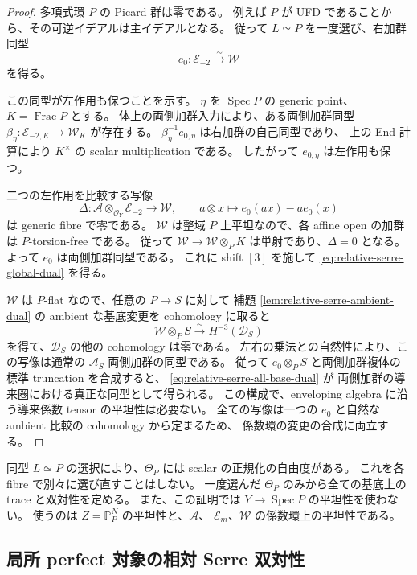 \begin{proof}
多項式環 $P$ の Picard 群は零である。
例えば $P$ が UFD であることから、その可逆イデアルは主イデアルとなる。
従って $L\simeq P$ を一度選び、右加群同型
\[
 e_0:\mathscr E_{-2}\xrightarrow{\sim}\mathscr W
\]
を得る。

この同型が左作用も保つことを示す。
$\eta$ を $\operatorname{Spec}P$ の generic point、$K=\operatorname{Frac}P$ とする。
体上の両側加群入力により、ある両側加群同型
$\beta_\eta:\mathscr E_{-2,K}\to\mathscr W_K$ が存在する。
$\beta_\eta^{-1}e_{0,\eta}$ は右加群の自己同型であり、
上の End 計算により $K^\times$ の scalar multiplication である。
したがって $e_{0,\eta}$ は左作用も保つ。

二つの左作用を比較する写像
\[
 \Delta:\mathscr A\otimes_{\mathcal O_Y}\mathscr E_{-2}
 \longrightarrow\mathscr W,\qquad
 a\otimes x\longmapsto e_0(ax)-a e_0(x)
\]
は generic fibre で零である。
$\mathscr W$ は整域 $P$ 上平坦なので、各 affine open の加群は
$P$-torsion-free である。
従って $\mathscr W\to\mathscr W\otimes_P K$ は単射であり、$\Delta=0$ となる。
よって $e_0$ は両側加群同型である。
これに shift $[3]$ を施して \eqref{eq:relative-serre-global-dual} を得る。

$\mathscr W$ は $P$-flat なので、任意の $P\to S$ に対して
補題 \ref{lem:relative-serre-ambient-dual} の ambient な基底変更を cohomology に取ると
\[
 \mathscr W\otimes_P S\xrightarrow{\sim}H^{-3}(\mathscr D_S)
\]
を得て、$\mathscr D_S$ の他の cohomology は零である。
左右の乗法との自然性により、この写像は通常の
$\mathscr A_S$-両側加群の同型である。
従って $e_0\otimes_P S$ と両側加群複体の標準 truncation を合成すると、
\eqref{eq:relative-serre-all-base-dual} が
両側加群の導来圏における真正な同型として得られる。
この構成で、enveloping algebra に沿う導来係数 tensor の平坦性は必要ない。
全ての写像は一つの $e_0$ と自然な ambient 比較の cohomology から定まるため、
係数環の変更の合成に両立する。
\end{proof}

\begin{remark}[正規化と平坦性の使い分け]
同型 $L\simeq P$ の選択により、$\Theta_P$ には scalar の正規化の自由度がある。
これを各 fibre で別々に選び直すことはしない。
一度選んだ $\Theta_P$ のみから全ての基底上の trace と双対性を定める。
また、この証明では $Y\to\operatorname{Spec}P$ の平坦性を使わない。
使うのは $Z=\mathbb P^N_P$ の平坦性と、$\mathscr A$、
$\mathscr E_m$、$\mathscr W$ の係数環上の平坦性である。
\end{remark}

\subsection{局所 perfect 対象の相対 Serre 双対性}

